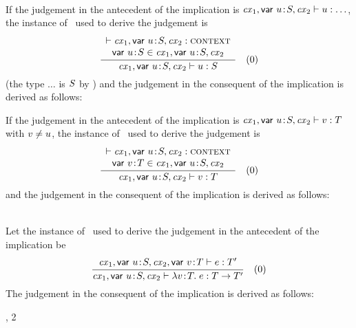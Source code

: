 \begin{bycase}
\Case{\Revar}\\
If the judgement in the antecedent of the implication is
$\mathit{cx}_1,\mathsf{var}\ u\!:\!S,\mathit{cx}_2\vdash u:\ldots$, the instance of \Revar\ used to derive the judgement
is
\[
\rruleII
 {\cxwf{\cxv}}
 {\vdec{\varI}{\typI}\in\cxv}
 {\hasty{\cxv}{\varI}{\typI}}
 {0}
\]
(the type $\ldots$ is $S$ by ) and the judgement
in the consequent of the implication is derived as follows:
\begin{derivation}
\end{derivation}

If the judgement in the antecedent of the implication is
$\mathit{cx}_1,\mathsf{var}\ u\!:\!S,\mathit{cx}_2\vdash v:T$ with $\var\neq\varI$, the instance of \Revar\ used
to derive the judgement is
\[
\rruleII
 {\cxwf{\cxv}}
 {\vdecO\in\cxv}
 {\hasty{\cxv}{\var}{\typ}}
 {0}
\]
and the judgement in the consequent of the implication is derived as follows:
\begin{derivation}
\step{\esbsren{\var}=\var}{\hyp\ $\var\neq\varI$}
\end{derivation}

\Case{\Reabs}\\
Let the instance of \Reabs\ used to derive the judgement in the antecedent of
the implication be
\[
\rruleI
 {\hasty{\snoc{\cxv}{\vdecO}}{\expr}{\typ'}}
 {\hasty{\cxv}{\absO}{\tarr{\typ}{\typ'}}}
 {0}
\]
The judgement in the consequent of the implication is derived as follows:
\begin{derivation}
     {\Reabs, 2}
\end{derivation}


\end{bycase}
